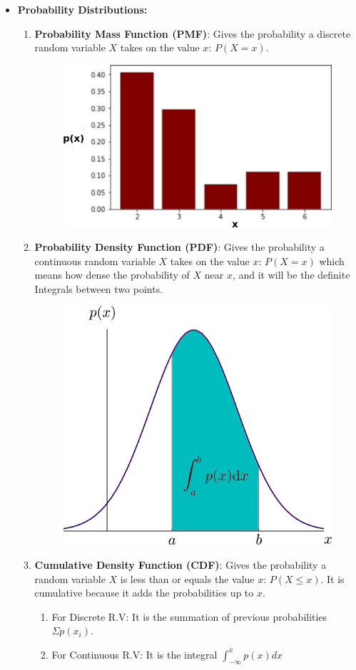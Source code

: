 \documentclass[11pt, twocolumn]{article}
\begin{document}
\begin{itemize}
\item \textbf{Probability Distributions:}
\begin{enumerate}
\item \textbf{Probability Mass Function (PMF)}: Gives the probability a {\color{blue}discrete} random variable $X$ takes on the value $x$: $P( X = x)$.
\begin{figure}[h!]
  \centering
  \includegraphics[width=0.75\linewidth]{figs/PMF.png}
\end{figure}
\item \textbf{Probability Density Function (PDF)}: Gives the probability a {\color{blue}continuous} random variable $X$ takes on the value $x$: $P( X = x)$ which means {\color{blue}how dense} the probability of $X$ near $x$, and it will be the definite Integrals between two points.
\begin{figure}[h!]
  \centering
  \includegraphics[width=0.65\linewidth]{figs/PDF.png}
\end{figure}
\item \textbf{Cumulative Density Function (CDF)}: Gives the probability a random variable $X$ is less than or equals the value $x$: $P( X \leq x)$. It is  cumulative because it adds the probabilities up to $x$.
	\begin{enumerate}
	\item For Discrete R.V: It is the summation of previous probabilities $\Sigma p(x_i)$.
	\item For Continuous R.V: It is the integral $\int_{-\infty}^{x} p(x) dx$
	\end{enumerate}
\end{enumerate}
\end{itemize}
\end{document}
